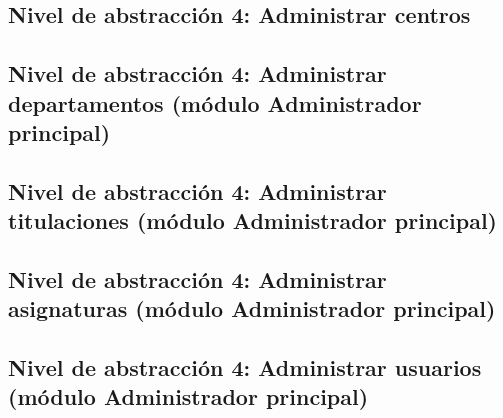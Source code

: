 \subsection{Nivel de abstracción 4: Administrar centros}



\subsection{Nivel de abstracción 4: Administrar departamentos (módulo Administrador principal)}



\subsection{Nivel de abstracción 4: Administrar titulaciones (\-mó\-dulo Administrador principal)}



\subsection{Nivel de abstracción 4: Administrar asignaturas (\-mó\-dulo Administrador principal)}



\subsection{Nivel de abstracción 4: Administrar usuarios (\-mó\-dulo Administrador principal)}

